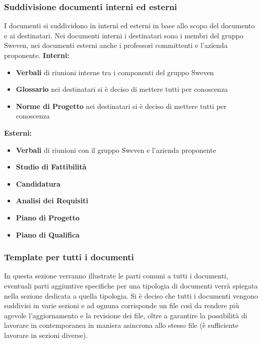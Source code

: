 \subsubsection{Suddivisione documenti interni ed esterni}
I documenti si suddividono in interni ed esterni in base allo scopo del documento e ai destinatari.
Nei documenti interni i destinatari sono i membri del gruppo Sweven, nei documenti esterni anche i 
professori committenti e l'azienda proponente. \newline
\textbf{Interni:}
\begin{itemize}
    \item \textbf{Verbali} di riunioni interne tra i componenti del gruppo Sweven
    \item \textbf{Glossario} nei destinatari si è deciso di mettere tutti per conoscenza
    \item \textbf{Norme di Progetto} nei destinatari si è deciso di mettere tutti per conoscenza
\end{itemize}

\textbf{Esterni:}
\begin{itemize}
    \item \textbf{Verbali} di riunioni con il gruppo Sweven e l'azienda proponente
    \item \textbf{Studio di Fattibilità}
    \item \textbf{Candidatura}
    \item \textbf{Analisi dei Requisiti}
    \item \textbf{Piano di Progetto}
    \item \textbf{Piano di Qualifica}
\end{itemize}

\subsubsection{Template per tutti i documenti}
In questa sezione verranno illustrate le parti comuni a tutti i documenti, 
eventuali parti aggiuntive specifiche per una tipologia di documenti
verrà spiegata nella sezione dedicata a quella tipologia. \newline
Si è deciso che tutti i documenti vengono suddivisi in varie sezioni 
e ad ognuna corrisponde un file così da rendere più agevole l'aggiornamento 
e la revisione dei file, oltre a garantire la possibilità di 
lavorare in contemporanea in maniera asincrona allo stesso file 
(è sufficiente lavorare in sezioni diverse).

